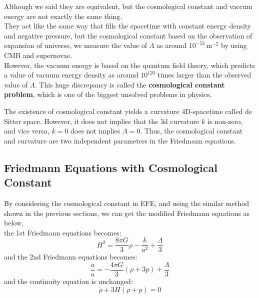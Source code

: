 \clearpage
\begin{importantnote}
    Although we said they are equivalent, but the cosmological constant and vaccum energy are not exactly the same thing. \\

    They act like the same way that fills the spacetime with constant energy density and negative pressure, but the cosmological constant based on the observation of expansion of universe, we measure the value of $\Lambda$ as around $10^{-52}\,\mathrm{m}^{-2}$ by using CMB and supernovae. \\
    
    However, the vacuum energy is based on the quantum field theory, which predicts a value of vacuum energy density as around $10^{120}$ times larger than the observed value of $\Lambda$. This huge discrepancy is called the \textbf{cosmological constant problem}, which is one of the biggest unsolved problems in physics.
\end{importantnote}

\bigskip \noindent 
\begin{importantnote}
    The existence of cosmological constant yields a curvature 4D-spacetime called de Sitter space. However, it does not implies that the 3d curvature $k$ is non-zero, and vice versa, $k = 0$ does not implies $\Lambda = 0$. Thus, the cosmological constant and curvature are two independent parameters in the Friedmann equations.
\end{importantnote}

\bigskip \noindent \bigskip \noindent \bigskip \noindent
\subsection{Friedmann Equations with Cosmological Constant}
\begin{theory}
    By considering the cosmological constant in EFE, and using the similar method shown in the previous sections, we can get the modified Friedmann equations as below, \\

    the 1st Friedmann equations becomes:
    \[
        H^2 = \frac{8\pi G}{3}\rho - \frac{k}{a^2} + \frac{\Lambda}{3}
    \]
    and the 2nd Friedmann equations becomes:
    \[
        \frac{\ddot{a}}{a} = -\frac{4\pi G}{3}(\rho + 3p) + \frac{\Lambda}{3}
    \]
    and the continuity equation is unchanged:
    \[
        \dot{\rho} + 3H(\rho + p) = 0
    \]
\end{theory}

